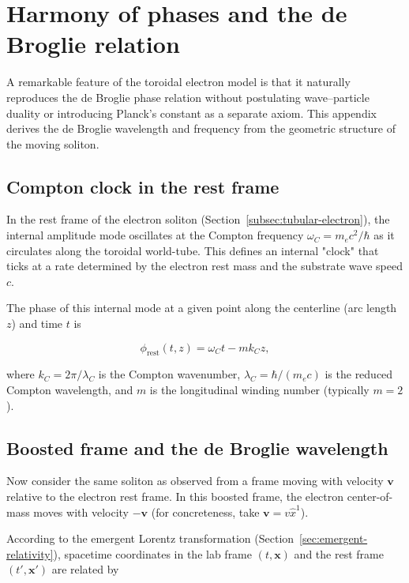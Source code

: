 \section{Harmony of phases and the de Broglie relation}
\label{subsec:harmony-phases}

A remarkable feature of the toroidal electron model is that it naturally
reproduces the de Broglie phase relation without postulating wave--particle
duality or introducing Planck's constant as a separate axiom. This appendix
derives the de Broglie wavelength and frequency from the geometric structure of
the moving soliton.

\subsection{Compton clock in the rest frame}

In the rest frame of the electron soliton (Section~\ref{subsec:tubular-electron}),
the internal amplitude mode oscillates at the Compton frequency $\omega_C = m_e
c^2 / \hbar$ as it circulates along the toroidal world-tube. This defines an
internal "clock" that ticks at a rate determined by the electron rest mass and
the substrate wave speed $c$.

The phase of this internal mode at a given point along the centerline (arc
length $z$) and time $t$ is

\begin{equation}
\phi_{\text{rest}}(t, z) = \omega_C t - m k_C z,
\end{equation}

where $k_C = 2\pi / \lambda_C$ is the Compton wavenumber, $\lambda_C = \hbar /
(m_e c)$ is the reduced Compton wavelength, and $m$ is the longitudinal winding
number (typically $m=2$).

\subsection{Boosted frame and the de Broglie wavelength}

Now consider the same soliton as observed from a frame moving with velocity
$\mathbf{v}$ relative to the electron rest frame. In this boosted frame, the
electron center-of-mass moves with velocity $-\mathbf{v}$ (for concreteness,
take $\mathbf{v} = v \hat{x}^1$).

According to the emergent Lorentz transformation (Section~\ref{sec:emergent-relativity}),
spacetime coordinates in the lab frame $(t, \mathbf{x})$ and the rest frame
$(t', \mathbf{x}')$ are related by

